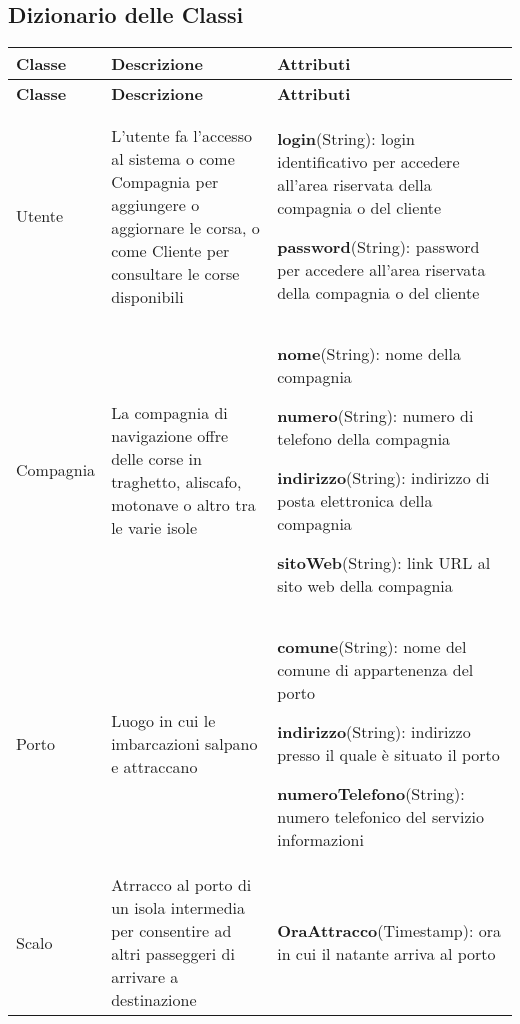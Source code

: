 \subsection{Dizionario delle Classi}

\vspace{4mm}

\begin{longtable}{|| m{} | m{} | m{} ||}
    \hline\hline
     \textbf{Classe} & \textbf{Descrizione} & \textbf{Attributi} \\
     \hline\hline
     \endfirsthead

     \hline
     \textbf{Classe} & \textbf{Descrizione} & \textbf{Attributi} \\
     \hline
     \endhead

     Utente & L'utente fa l'accesso al sistema o come Compagnia per aggiungere o aggiornare le corsa, o come Cliente per consultare le corse disponibili &
     \textbf{login}(String): login identificativo per accedere all'area riservata della compagnia o del cliente
     
     \textbf{password}(String): password per accedere all'area riservata della compagnia o del cliente\\
     \hline

     Compagnia & La compagnia di navigazione offre delle corse in traghetto, aliscafo, motonave o altro tra le varie isole  & 
     \textbf{nome}(String): nome della compagnia

     \textbf{numero}(String): numero di telefono della compagnia

     \textbf{indirizzo}(String): indirizzo di posta elettronica della compagnia
     
     \textbf{sitoWeb}(String): link URL al sito web della compagnia\\
     \hline

     Porto & Luogo in cui le imbarcazioni salpano e attraccano &
     \textbf{comune}(String): nome del comune di appartenenza del porto
     
     \textbf{indirizzo}(String): indirizzo presso il quale è situato il porto
     
     \textbf{numeroTelefono}(String): numero telefonico del servizio informazioni\\
     \hline

     Scalo & Atrracco al porto di un isola intermedia per consentire ad altri passeggeri di arrivare a destinazione & 
     \textbf{OraAttracco}(Timestamp): ora in cui il natante arriva al porto
     

\end{longtable}
